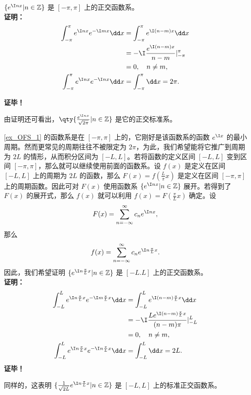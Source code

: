  \begin{example}{}\label{ex_OFS_1}
 $\{e^{\I nx}|n\in\mathbb Z\}$ 是 $[-\pi,\pi]$ 上的正交函数系。\\
 
\textbf{证明：}
\begin{equation}
\begin{aligned}
\int_{-\pi}^\pi e^{\I nx}e^{-\I mx}\dd x&=\int_{-\pi}^\pi e^{\I (n-m)x}\dd x\\&=-\I\frac{e^{\I(n-m)x}}{n-m}{\huge|}_{-\pi}^{\pi}\\
&=0,\quad n\neq m,\\
\int_{-\pi}^\pi e^{\I nx}e^{-\I nx}\dd x&=\int_{-\pi}^\pi \dd x=2\pi.
\end{aligned}~
\end{equation}

\textbf{证毕！}

由证明还可看出，$\qty{\frac{e^{\I nx}}{\sqrt{2\pi}}{\huge|}n\in\mathbb Z}$ 是它的正交标准系。
 \end{example}
 \begin{example}{}\label{ex_OFS_2}
 \autoref{ex_OFS_1} 的函数系是在 $[-\pi,\pi]$ 上的，它刚好是该函数系的函数 $e^{\I x}$ 的最小周期。然而更常见的周期往往不被限定为 $2\pi$，为此，我们希望能将它推广到周期为 $2L$ 的情形，从而积分区间为 $[-L,L]$。若将函数的定义区间 $[-L,L]$ 变到区间 $[-\pi,\pi]$，那么就可以继续使用前面的函数系。设 $f(x)$ 是定义在区间 $[-L,L]$ 上的周期为 $2L$ 的函数，那么 $F(x)=f(\frac{L}{\pi}x)$ 是定义在区间 $[-\pi,\pi]$ 上的周期函数。因此可对 $F(x)$ 使用函数系 $\{e^{\I nx}|n\in\mathbb Z\}$ 展开。若得到了 $F(x)$ 的展开式，那么 $f(x)$ 就可以利用 $f(x)=F(\frac{\pi}{L}x)$ 确定。设 
 \begin{equation}
 F(x)=\sum_{n=-\infty}^\infty c_ne^{\I n x},~
 \end{equation}
 那么
 \begin{equation}\label{eq_OFS_5}
 f(x)=\sum_{n=-\infty}^\infty c_ne^{\I n\frac{\pi}{L} x}.~
 \end{equation}
 因此，我们希望证明 $\{e^{\I n\frac{\pi}{L} x}|n\in\mathbb Z\}$ 是 $[-L.L]$ 上的正交函数系。\\
\textbf{证明：}
\begin{equation}
\begin{aligned}
\int_{-L}^L e^{\I n\frac{\pi}{L}x}e^{-\I m\frac{\pi}{L}x}\dd x&=\int_{-L}^L e^{\I (n-m)\frac{\pi}{L}x}\dd x\\
&=-\I\frac{Le^{\I(n-m)\frac{\pi}{L}x}}{(n-m)\pi}{\huge|}_{-L}^{L}\\
&=0,\quad n\neq m,\\
\int_{-L}^L e^{\I n\frac{\pi}{L}x}e^{-\I n\frac{\pi}{L}x}\dd x&=\int_{-L}^L \dd x=2L.
\end{aligned}~
\end{equation}
\textbf{证毕！}

同样的，这表明 $\{\frac{1}{\sqrt{2L}}e^{\I n\frac{\pi}{L} x}|n\in\mathbb Z\}$ 是 $[-L,L]$ 上的标准正交函数系。
 \end{example}

